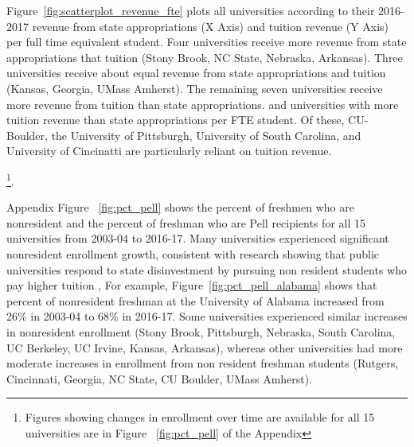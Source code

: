 \documentclass[twoside]{article}
\begin{document}
Figure~\ref{fig:scatterplot_revenue_fte} plots all universities according to their 2016-2017 revenue from state appropriations (X Axis) and tuition revenue (Y Axis) per full time equivalent student. Four universities receive more revenue from state appropriations that tuition (Stony Brook, NC State, Nebraska, Arkansas). Three universities receive about equal revenue from state appropriations and tuition (Kansas, Georgia, UMass Amherst). The remaining seven universities receive more revenue from tuition than state appropriations.  and universities with more tuition revenue than state appropriations per FTE student.  Of these, CU-Boulder, the University of Pittsburgh, University of South Carolina, and University of Cincinatti are particularly reliant on tuition revenue.


\footnote{Figures showing changes in enrollment over time are available for all 15 universities are in Figure ~\ref{fig:pct_pell} of the Appendix}.

Appendix Figure ~\ref{fig:pct_pell} shows the percent of freshmen who are nonresident and the percent of freshman who are Pell recipients for all 15 universities from 2003-04 to 2016-17.  Many universities experienced significant nonresident enrollment growth, consistent with research showing that public universities respond to state disinvestment by pursuing non resident students who pay higher tuition \citep{RN3753},  For example, Figure~\ref{fig:pct_pell_alabama} shows that percent of nonresident freshman at the University of Alabama increased from 26\% in 2003-04 to 68\% in 2016-17. Some universities experienced similar increases in nonresident enrollment (Stony Brook, Pittsburgh, Nebraska, South Carolina, UC Berkeley, UC Irvine, Kansas, Arkansas), whereas other universities had more moderate increases in enrollment from non resident freshman students (Rutgers, Cincinnati, Georgia, NC State, CU Boulder, UMass Amherst).

\end{document}
